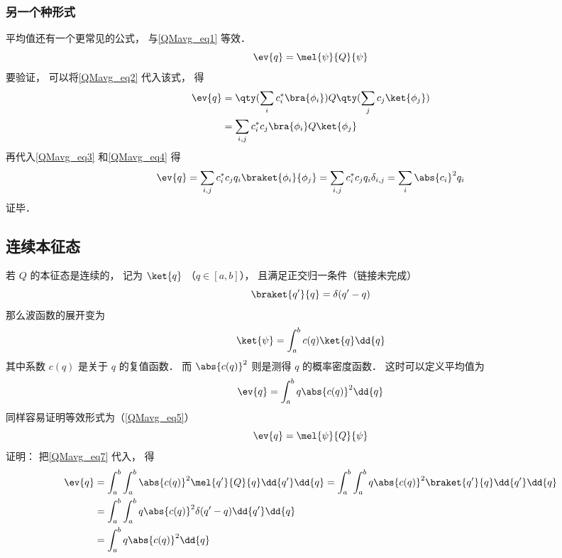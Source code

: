 \subsubsection{另一个种形式}
平均值还有一个更常见的公式， 与\autoref{QMavg_eq1} 等效．
\begin{equation}\label{QMavg_eq5}
\ev{q} = \mel{\psi}{Q}{\psi}
\end{equation}
要验证， 可以将\autoref{QMavg_eq2} 代入该式， 得
\begin{equation}
\begin{aligned}
\ev{q} &= \qty(\sum_i c_i^* \bra{\phi_i}) Q \qty(\sum_j c_j \ket{\phi_j})\\
&= \sum_{i,j} c_i^* c_j \bra{\phi_i} Q \ket{\phi_j}
\end{aligned} 
\end{equation}
再代入\autoref{QMavg_eq3} 和\autoref{QMavg_eq4} 得
\begin{equation}
\ev{q} = \sum_{i,j} c_i^* c_j q_i \braket{\phi_i}{\phi_j}
= \sum_{i,j} c_i^* c_j q_i \delta_{i,j} = \sum_i \abs{c_i}^2 q_i
\end{equation}
证毕．

\subsection{连续本征态}
若 $Q$ 的本征态是连续的， 记为 $\ket{q}$ （$q\in [a,b]$）， 且满足正交归一条件（链接未完成）
\begin{equation}
\braket{q'}{q} = \delta(q'-q)
\end{equation}
那么波函数的展开变为
\begin{equation}\label{QMavg_eq7}
\ket{\psi} = \int_a^b c(q) \ket{q} \dd{q}
\end{equation}
其中系数 $c(q)$ 是关于 $q$ 的复值函数． 而 $\abs{c(q)}^2$ 则是测得 $q$ 的概率密度函数． 这时可以定义平均值为
\begin{equation}
\ev{q} = \int_a^b q \abs{c(q)}^2 \dd{q}
\end{equation}
同样容易证明等效形式为（\autoref{QMavg_eq5}）
\begin{equation}
\ev{q} = \mel{\psi}{Q}{\psi}
\end{equation}
证明： 把\autoref{QMavg_eq7} 代入， 得
\begin{equation}
\begin{aligned}
\ev{q} &= \int_a^b\int_a^b \abs{c(q)}^2\mel{q'}{Q}{q} \dd{q'}\dd{q} = \int_a^b\int_a^b q\abs{c(q)}^2\braket{q'}{q} \dd{q'}\dd{q}\\
&= \int_a^b\int_a^b q\abs{c(q)}^2\delta(q'-q) \dd{q'}\dd{q}\\
&= \int_a^b q\abs{c(q)}^2 \dd{q}
\end{aligned}
\end{equation}


